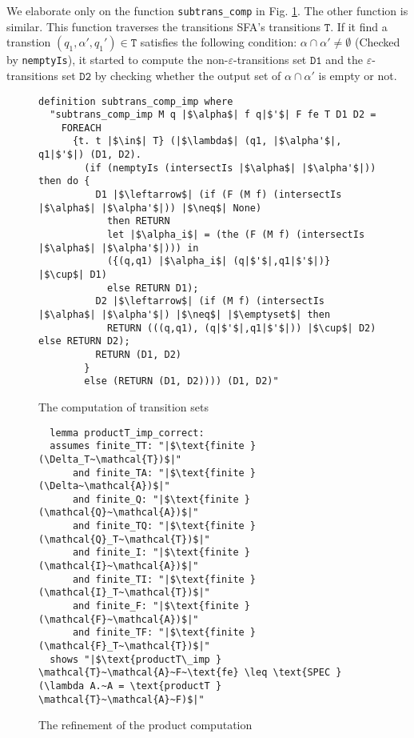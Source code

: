 \documentclass[a4paper,UKenglish,cleveref, autoref, anonymous, thm-restate]{lipics-v2021}
\begin{document}
We elaborate only on the function \texttt{subtrans\_comp} in Fig. \ref{fig-def-subtrans_comp}. The other function is similar. 
This function traverses the transitions SFA's transitions $\texttt{T}$. If it find a transtion $(q_1, \alpha', q_1')\in \texttt{T}$ satisfies the following condition:
$\alpha \cap \alpha' \neq \emptyset$ (Checked by \texttt{nemptyIs}),
it started to compute the non-$\varepsilon$-transitions set $\texttt{D1}$ and the $\varepsilon$-transitions set $\texttt{D2}$ by checking whether the output set of $\alpha \cap \alpha'$ is empty or not.


\begin{figure}[hbt!]
	\begin{lstlisting}
definition subtrans_comp_imp where
  "subtrans_comp_imp M q |$\alpha$| f q|$'$| F fe T D1 D2 =
    FOREACH
      {t. t |$\in$| T} (|$\lambda$| (q1, |$\alpha'$|, q1|$'$|) (D1, D2).
        (if (nemptyIs (intersectIs |$\alpha$| |$\alpha'$|)) then do {
          D1 |$\leftarrow$| (if (F (M f) (intersectIs |$\alpha$| |$\alpha'$|)) |$\neq$| None) 
            then RETURN 
            let |$\alpha_i$| = (the (F (M f) (intersectIs |$\alpha$| |$\alpha'$|))) in
            ({(q,q1) |$\alpha_i$| (q|$'$|,q1|$'$|)} |$\cup$| D1)
            else RETURN D1);
          D2 |$\leftarrow$| (if (M f) (intersectIs |$\alpha$| |$\alpha'$|) |$\neq$| |$\emptyset$| then 
            RETURN (((q,q1), (q|$'$|,q1|$'$|)) |$\cup$| D2) else RETURN D2);
          RETURN (D1, D2)
        }
        else (RETURN (D1, D2)))) (D1, D2)"
    \end{lstlisting}
    \caption{The computation of transition sets}
    \label{fig-def-subtrans_comp}
    \end{figure}


 

  \begin{figure}[hbt!]
    \begin{lstlisting}
  lemma productT_imp_correct:
  assumes finite_TT: "|$\text{finite } (\Delta_T~\mathcal{T})$|"    
      and finite_TA: "|$\text{finite } (\Delta~\mathcal{A})$|"
      and finite_Q: "|$\text{finite } (\mathcal{Q}~\mathcal{A})$|"
      and finite_TQ: "|$\text{finite } (\mathcal{Q}_T~\mathcal{T})$|"
      and finite_I: "|$\text{finite } (\mathcal{I}~\mathcal{A})$|"
      and finite_TI: "|$\text{finite } (\mathcal{I}_T~\mathcal{T})$|"
      and finite_F: "|$\text{finite } (\mathcal{F}~\mathcal{A})$|"
      and finite_TF: "|$\text{finite } (\mathcal{F}_T~\mathcal{T})$|"
  shows "|$\text{productT\_imp } \mathcal{T}~\mathcal{A}~F~\text{fe} \leq \text{SPEC } (\lambda A.~A = \text{productT } \mathcal{T}~\mathcal{A}~F)$|"
  \end{lstlisting}
  \caption{The refinement of the product computation}
  \label{fig-def-productT_imp_correct}
  \end{figure}
\end{document}
